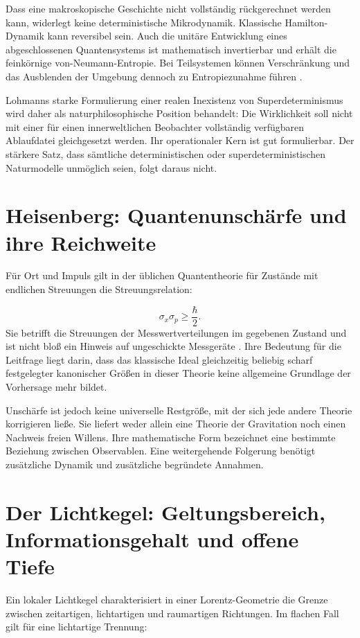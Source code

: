 Dass eine makroskopische Geschichte nicht vollständig rückgerechnet werden kann, widerlegt keine deterministische Mikrodynamik. Klassische Hamilton-Dynamik kann reversibel sein. Auch die unitäre Entwicklung eines abgeschlossenen Quantensystems ist mathematisch invertierbar und erhält die feinkörnige von-Neumann-Entropie. Bei Teilsystemen können Verschränkung und das Ausblenden der Umgebung dennoch zu Entropiezunahme führen \cite{16,18}.

Lohmanns starke Formulierung einer realen Inexistenz von Superdeterminismus wird daher als naturphilosophische Position behandelt: Die Wirklichkeit soll nicht mit einer für einen innerweltlichen Beobachter vollständig verfügbaren Ablaufdatei gleichgesetzt werden. Ihr operationaler Kern ist gut formulierbar. Der stärkere Satz, dass sämtliche deterministischen oder superdeterministischen Naturmodelle unmöglich seien, folgt daraus nicht.

\section{Heisenberg: Quantenunschärfe und ihre Reichweite}\label{de:sec6}
Für Ort und Impuls gilt in der üblichen Quantentheorie für Zustände mit endlichen Streuungen die Streuungsrelation:

\begin{equation}\label{de:eq6}
\sigma_x\sigma_p\geq\frac{\hbar}{2}.
\end{equation}
Sie betrifft die Streuungen der Messwertverteilungen im gegebenen Zustand und ist nicht bloß ein Hinweis auf ungeschickte Messgeräte \cite{2,3}. Ihre Bedeutung für die Leitfrage liegt darin, dass das klassische Ideal gleichzeitig beliebig scharf festgelegter kanonischer Größen in dieser Theorie keine allgemeine Grundlage der Vorhersage mehr bildet.

Unschärfe ist jedoch keine universelle Restgröße, mit der sich jede andere Theorie korrigieren ließe. Sie liefert weder allein eine Theorie der Gravitation noch einen Nachweis freien Willens. Ihre mathematische Form bezeichnet eine bestimmte Beziehung zwischen Observablen. Eine weitergehende Folgerung benötigt zusätzliche Dynamik und zusätzliche begründete Annahmen.

\section{Der Lichtkegel: Geltungsbereich, Informationsgehalt und offene Tiefe}\label{de:sec7}
Ein lokaler Lichtkegel charakterisiert in einer Lorentz-Geometrie die Grenze zwischen zeitartigen, lichtartigen und raumartigen Richtungen. Im flachen Fall gilt für eine lichtartige Trennung:

